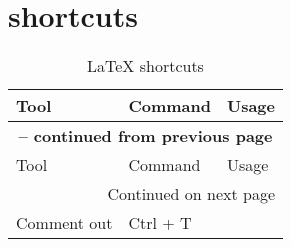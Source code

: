 
\chapter{shortcuts}

\begin{longtable}{|l|l|l|}
	\caption{\LaTeX{} shortcuts} \label{table: latex shortcuts} \\
	
	\hline
	Tool & Command & Usage \\
	\hline
	\endfirsthead
	
	\multicolumn{3}{c}{{\bfseries \tablename{} \thetable{} -- continued from previous page}}\\
	\hline
	Tool & Command & Usage \\
	\hline
	\endhead
	
	\multicolumn{3}{r}{Continued on next page}\\
	\hline
	\endfoot
	
	\hline \hline
	\endlastfoot
	
	Comment out & Ctrl + T & \\
	\hline
	
\end{longtable}